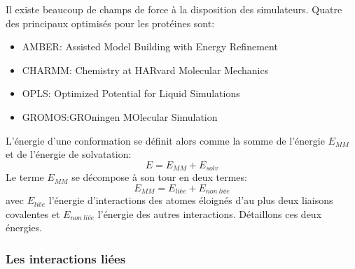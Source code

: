 Il existe beaucoup de champs de force à la disposition des simulateurs. Quatre des principaux optimisés pour les protéines sont:

\begin{itemize}
\item AMBER: Assisted Model Building with Energy Refinement \cite{Cornell95}
\item CHARMM: Chemistry at HARvard Molecular Mechanics \cite{Brooks09}
\item OPLS: Optimized Potential for Liquid Simulations \cite{Jorgensen88}
\item GROMOS:GROningen MOlecular Simulation \cite{Christen05}
\end{itemize}
L'énergie d'une conformation se définit alors comme la somme de l'énergie $E_{MM}$  et de l'énergie de solvatation:
\begin{equation}
  E = E_{MM} + E_{solv}
\end{equation}
Le terme $E_{MM}$ se décompose à son tour en deux termes:
\begin{equation}
  E_{MM} = E_{liée} + E_{non\ liée}
\end{equation}
avec $E_{liée}$ l'énergie d'interactions des atomes éloignés d'au plus deux liaisons covalentes et $E_{non\ liée}$  l'énergie des autres interactions. Détaillons ces deux énergies.

\subsubsection{Les interactions liées }

